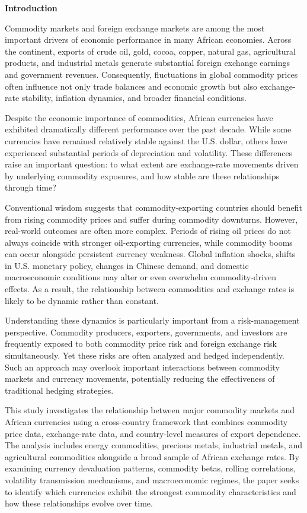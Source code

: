 \documentclass{article}
\begin{document}
\newpage
\tableofcontents
\newpage
\begin{center}
{\Large \textbf{ Introduction}}
\end{center}
Commodity markets and foreign exchange markets are among the most important drivers of economic performance in many African economies. Across the continent, exports of crude oil, gold, cocoa, copper, natural gas, agricultural products, and industrial metals generate substantial foreign exchange earnings and government revenues. Consequently, fluctuations in global commodity prices often influence not only trade balances and economic growth but also exchange-rate stability, inflation dynamics, and broader financial conditions.

Despite the economic importance of commodities, African currencies have exhibited dramatically different performance over the past decade. While some currencies have remained relatively stable against the U.S. dollar, others have experienced substantial periods of depreciation and volatility. These differences raise an important question: to what extent are exchange-rate movements driven by underlying commodity exposures, and how stable are these relationships through time?

Conventional wisdom suggests that commodity-exporting countries should benefit from rising commodity prices and suffer during commodity downturns. However, real-world outcomes are often more complex. Periods of rising oil prices do not always coincide with stronger oil-exporting currencies, while commodity booms can occur alongside persistent currency weakness. Global inflation shocks, shifts in U.S. monetary policy, changes in Chinese demand, and domestic macroeconomic conditions may alter or even overwhelm commodity-driven effects. As a result, the relationship between commodities and exchange rates is likely to be dynamic rather than constant.

Understanding these dynamics is particularly important from a risk-management perspective. Commodity producers, exporters, governments, and investors are frequently exposed to both commodity price risk and foreign exchange risk simultaneously. Yet these risks are often analyzed and hedged independently. Such an approach may overlook important interactions between commodity markets and currency movements, potentially reducing the effectiveness of traditional hedging strategies.

This study investigates the relationship between major commodity markets and African currencies using a cross-country framework that combines commodity price data, exchange-rate data, and country-level measures of export dependence. The analysis includes energy commodities, precious metals, industrial metals, and agricultural commodities alongside a broad sample of African exchange rates. By examining currency devaluation patterns, commodity betas, rolling correlations, volatility transmission mechanisms, and macroeconomic regimes, the paper seeks to identify which currencies exhibit the strongest commodity characteristics and how these relationships evolve over time.
\end{document}
